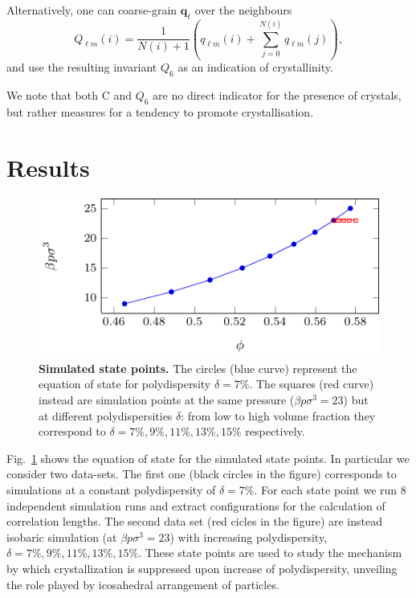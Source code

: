 \documentclass[twocolumn,superscriptaddress]{revtex4-1}
\begin{document}
Alternatively, one can coarse-grain $\mathbf{q}_\ell$ over the neighbours~\cite{lechner}
\begin{equation}
	Q_{\ell m}(i) = \frac{1}{N(i)+1}\left( q_{\ell m}(i) +  \sum_{j=0}^{N(i)} q_{\ell m}(j)\right), 
	\label{eq:Qlm}
\end{equation}
and use the resulting invariant $Q_6$ as an indication of crystallinity.

We note that both $\text{C}$ and $Q_6$ are no direct indicator for the presence of crystals, but rather measures for a tendency to promote crystallisation.

\section{Results}

\begin{figure}
 \centering
 \includegraphics{fig_eos}
 \caption{\textbf{Simulated state points.} The circles (blue curve) represent the equation of state for polydispersity $\delta=7\%$. The squares (red curve) instead are simulation points at the same pressure ($\beta p\sigma^3=23$) but at different polydispersities $\delta$: from low to high volume fraction they correspond to $\delta=7\%,9\%,11\%,13\%,15\%$ respectively.}
 \label{fig:eos}
\end{figure}


Fig.~\ref{fig:eos} shows the equation of state for the simulated state points. In particular
we consider two data-sets. The first one (black circles in the figure) corresponds to
simulations at a constant polydispersity of $\delta=7\%$. For each state point we run $8$ independent
simulation runs and extract configurations for the calculation of correlation lengths.
The second data set (red cicles in the figure) are instead isobaric simulation (at $\beta p\sigma^3=23$)
with increasing polydispersity, $\delta=7\%,9\%,11\%,13\%,15\%$. These state points are used to study
the mechanism by which crystallization is suppressed upon increase of polydispersity, unveiling the
role played by icosahedral arrangement of particles.
\end{document}

